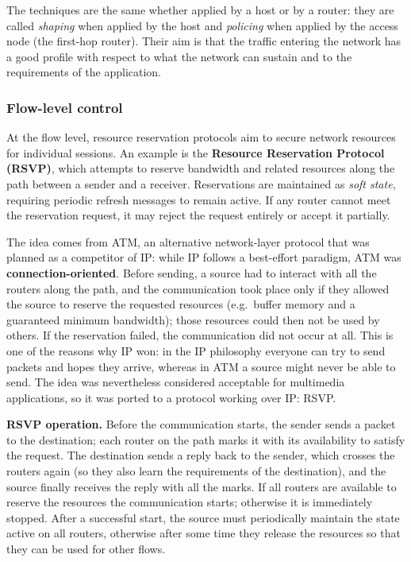 The techniques are the same whether applied by a host or by a router: they are called \emph{shaping} when applied by the host and \emph{policing} when applied by the access node (the first-hop router). Their aim is that the traffic entering the network has a good profile with respect to what the network can sustain and to the requirements of the application.

\subsubsection*{Flow-level control}

At the flow level, resource reservation protocols aim to secure network resources for individual sessions. An example is the \textbf{Resource Reservation Protocol (RSVP)}, which attempts to reserve bandwidth and related resources along the path between a sender and a receiver. Reservations are maintained as \emph{soft state}, requiring periodic refresh messages to remain active. If any router cannot meet the reservation request, it may reject the request entirely or accept it partially.

The idea comes from ATM, an alternative network-layer protocol that was planned as a competitor of IP: while IP follows a best-effort paradigm, ATM was \textbf{connection-oriented}. Before sending, a source had to interact with all the routers along the path, and the communication took place only if they allowed the source to reserve the requested resources (e.g.\ buffer memory and a guaranteed minimum bandwidth); those resources could then not be used by others. If the reservation failed, the communication did not occur at all. This is one of the reasons why IP won: in the IP philosophy everyone can try to send packets and hopes they arrive, whereas in ATM a source might never be able to send. The idea was nevertheless considered acceptable for multimedia applications, so it was ported to a protocol working over IP: RSVP.

\textbf{RSVP operation.} Before the communication starts, the sender sends a packet to the destination; each router on the path marks it with its availability to satisfy the request. The destination sends a reply back to the sender, which crosses the routers again (so they also learn the requirements of the destination), and the source finally receives the reply with all the marks. If all routers are available to reserve the resources the communication starts; otherwise it is immediately stopped. After a successful start, the source must periodically maintain the state active on all routers, otherwise after some time they release the resources so that they can be used for other flows.

